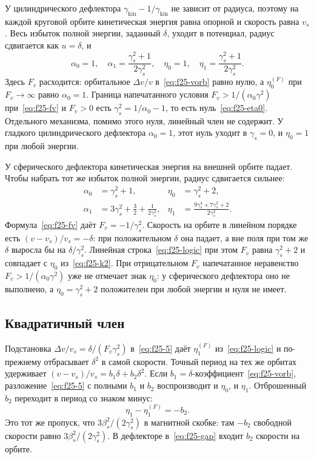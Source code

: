 У цилиндрического дефлектора $\gamma_{\mathrm{kin}}-1/\gamma_{\mathrm{kin}}$ не зависит от радиуса, поэтому на каждой круговой орбите кинетическая энергия равна опорной и скорость равна $v_s$. Весь избыток полной энергии, заданный $\delta$, уходит в потенциал, радиус сдвигается как $u=\delta$, и
\begin{equation}
\label{eq:f25-k1}
\alpha_0=1,
\quad
\alpha_1=\frac{\gamma_s^2+1}{2\gamma_s^2},
\quad
\eta_0=1,
\quad
\eta_1=\frac{\gamma_s^2+1}{2\gamma_s^2}.
\end{equation}
Здесь $F_v$ расходится: орбитальное $\Delta v/v$ в~\eqref{eq:f25-vorb} равно нулю, а $\eta_0^{(F)}$ при $F_v\to\infty$ равно $\alpha_0=1$. Граница напечатанного условия $F_v>1/(\alpha_0\gamma^2)$ при~\eqref{eq:f25-fv} и $F_v>0$ есть $\gamma_s^2=1/\alpha_0-1$, то есть нуль~\eqref{eq:f25-eta0}. Отдельного механизма, помимо этого нуля, линейный член не содержит. У гладкого цилиндрического дефлектора $\alpha_0=1$, этот нуль уходит в $\gamma_s=0$, и $\eta_0=1$ при любой энергии.

У сферического дефлектора кинетическая энергия на внешней орбите падает. Чтобы набрать тот же избыток полной энергии, радиус сдвигается сильнее:
\begin{equation}
\label{eq:f25-k2}
\begin{aligned}
\alpha_0&=\gamma_s^2+1,
&
\eta_0&=\gamma_s^2+2,
\\
\alpha_1&=3\gamma_s^2+\frac{3}{2}+\frac{1}{2\gamma_s^2},
&
\eta_1&=\frac{9\gamma_s^4+7\gamma_s^2+2}{2\gamma_s^2}.
\end{aligned}
\end{equation}
Формула~\eqref{eq:f25-fv} даёт $F_v=-1/\gamma_s^2$. Скорость на орбите в линейном порядке есть $(v-v_s)/v_s=-\delta$: при положительном $\delta$ она падает, а вне поля при том же $\delta$ выросла бы на $\delta/\gamma_s^2$. Линейная строка~\eqref{eq:f25-logic} при этом $F_v$ равна $\gamma_s^2+2$ и совпадает с $\eta_0$ из~\eqref{eq:f25-k2}. При отрицательном $F_v$ напечатанное неравенство $F_v>1/(\alpha_0\gamma^2)$ уже не отмечает знак $\eta_0$: у сферического дефлектора оно не выполнено, а $\eta_0=\gamma_s^2+2$ положителен при любой энергии и нуля не имеет.

\subsection{Квадратичный член}
\label{sec:f25-quad}

Подстановка $\Delta v/v_s=\delta/(F_v\gamma_s^2)$ в~\eqref{eq:f25-5} даёт $\eta_1^{(F)}$ из~\eqref{eq:f25-logic} и по-прежнему отбрасывает $\delta^2$ в самой скорости. Точный период на тех же орбитах удерживает $(v-v_s)/v_s=b_1\delta+b_2\delta^2$. Если $b_1=\delta$-коэффициент~\eqref{eq:f25-vorb}, разложение~\eqref{eq:f25-5} с полными $b_1$ и $b_2$ воспроизводит и $\eta_0$, и $\eta_1$. Отброшенный $b_2$ переходит в период со знаком минус:
\begin{equation}
\label{eq:f25-gap}
\eta_1-\eta_1^{(F)}=-b_2.
\end{equation}
Это тот же пропуск, что $3\beta_s^2/(2\gamma_s^2)$ в магнитной скобке: там $-b_2$ свободной скорости равно $3\beta_s^2/(2\gamma_s^2)$. В дефлекторе в~\eqref{eq:f25-gap} входит $b_2$ скорости на орбите.

